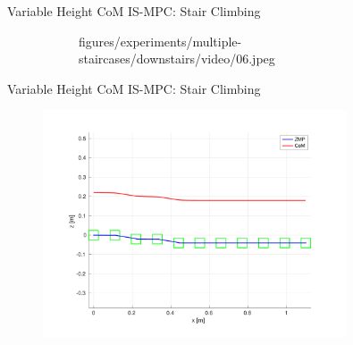 \documentclass[10pt]{beamer}
\begin{document}
\begin{frame}{Variable Height CoM IS-MPC: Stair Climbing}
\begin{figure}
\begin{subfigure}{0.40\textwidth}
				{figures/experiments/multiple-staircases/downstairs/video/06.jpeg}
		\end{subfigure}
	\end{figure}
\end{frame}

\begin{frame}{Variable Height CoM IS-MPC: Stair Climbing}	
	\begin{figure}
		\centering
		\includegraphics[width=0.8\textwidth]
				{figures/experiments/multiple-staircases/downstairs/xz-plot-2cm.pdf}
	\end{figure}
\end{frame}
\end{document}

